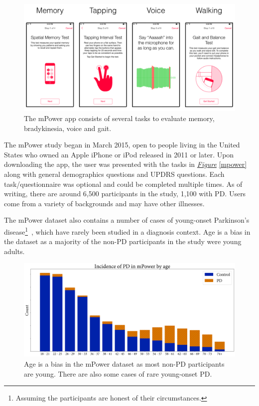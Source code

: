 \documentclass[12pt, twoside]{book}
\begin{document}
\begin{figure}[h]
\label{mpowerapp}
\centering\includegraphics[width=1\linewidth]{mpower.png}
\caption{The mPower app consists of several tasks to evaluate memory, bradykinesia, voice and gait. }
\end{figure}

The mPower study began in March 2015, open to people living in the United States who owned an Apple iPhone or iPod released in 2011 or later. Upon downloading the app, the user was presented with the tasks in \textit{\hyperref[mpower]{Figure}} \ref{mpower} along with general demographics questions and UPDRS questions. Each task/questionnaire was optional and could be completed multiple times. As of writing, there are around 6,500 participants in the study, 1,100 with PD. Users come from a variety of backgrounds and may have other illnesses.

The mPower dataset also contains a number of cases of young-onset Parkinson's disease\footnote{Assuming the participants are honest of their circumstances.}~\cite{youngpd1, youngpd2}, which have rarely been studied in a diagnosis context. Age is a bias in the dataset as a majority of the non-PD participants in the study were young adults. %

\addtocounter{footnote}{-1}
\begin{figure}[h]
\label{mpowerage}
\centering\includegraphics[width=1\linewidth]{mpowerage.png}
\caption{Age is a bias in the mPower dataset as most non-PD participants are young. There are also some cases of rare young-onset PD\protect\footnotemark.}
\end{figure}
\end{document}
